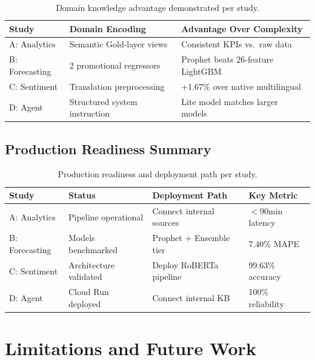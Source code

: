 \documentclass[11pt,a4paper]{article}
\begin{document}
\begin{table}[H]
\caption{Domain knowledge advantage demonstrated per study.}
\setlength{\tabcolsep}{12pt}
\renewcommand{\arraystretch}{1.4}
\begin{tabular}{l l l}
\toprule
\textbf{Study} & \textbf{Domain Encoding} & \textbf{Advantage Over Complexity} \\
\midrule
A: Analytics & Semantic Gold-layer views & Consistent KPIs vs.\ raw data \\
B: Forecasting & 2 promotional regressors & Prophet beats 26-feature LightGBM \\
C: Sentiment & Translation preprocessing & +1.67\% over native multilingual \\
D: Agent & Structured system instruction & Lite model matches larger models \\
\bottomrule
\end{tabular}
\end{table}

\subsection{Production Readiness Summary}

\begin{table}[H]
\caption{Production readiness and deployment path per study.}
\setlength{\tabcolsep}{12pt}
\renewcommand{\arraystretch}{1.4}
\begin{tabular}{l l l l}
\toprule
\textbf{Study} & \textbf{Status} & \textbf{Deployment Path} & \textbf{Key Metric} \\
\midrule
A: Analytics & Pipeline operational & Connect internal sources & $<$90min latency \\
B: Forecasting & Models benchmarked & Prophet + Ensemble tier & 7.40\% MAPE \\
C: Sentiment & Architecture validated & Deploy RoBERTa pipeline & 99.63\% accuracy \\
D: Agent & Cloud Run deployed & Connect internal KB & 100\% reliability \\
\bottomrule
\end{tabular}
\end{table}

\section{Limitations and Future Work}
\end{document}
